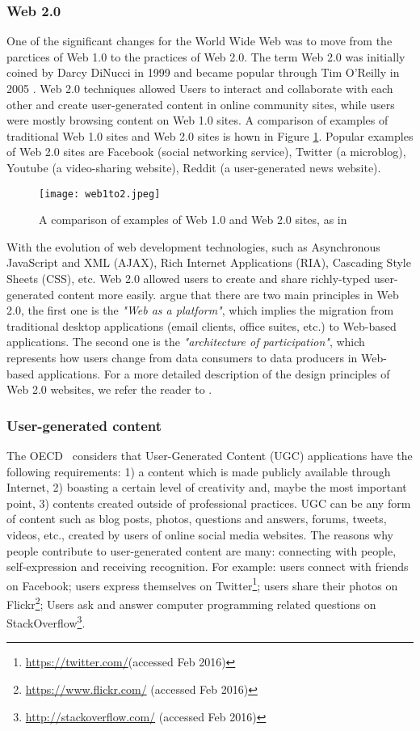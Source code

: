 \subsubsection{Web 2.0}
One of the significant changes for the World Wide Web was to move from the parctices of Web 1.0 to the practices of Web 2.0. The term Web 2.0 was initially coined by Darcy DiNucci in 1999  \cite{dinucci2012fragmented} and became popular through Tim O'Reilly in 2005 \cite{o2009design}. Web 2.0 techniques allowed Users to interact and collaborate with each other and create user-generated content in online community sites, while users were mostly browsing content on Web 1.0 sites. A comparison of examples of traditional Web 1.0 sites and Web 2.0 sites is hown in Figure \ref{fig:web1to2}. Popular examples of Web 2.0 sites are Facebook (social networking service), Twitter (a microblog), Youtube (a video-sharing website), Reddit (a user-generated news website).

\begin{figure}%
\centering
\texttt{[image: web1to2.jpeg]}  
\caption{A comparison of examples of Web 1.0 and Web 2.0 sites, as in \cite{o2009design}}
\label{fig:web1to2} 
\end{figure}
With the evolution of web development technologies, such as Asynchronous JavaScript and XML (AJAX), Rich Internet Applications (RIA), Cascading Style Sheets (CSS), etc. Web 2.0 allowed users to create and share richly-typed user-generated content more easily. \cite{passant2009technologies} argue that there are two main principles in Web 2.0, the first one is the \textit{"Web as a platform"}, which implies the migration from traditional desktop applications (email clients, office suites, etc.) to Web-based applications. The second one is the \textit{"architecture of participation"}, which represents how users change from data consumers to data producers in Web-based applications. For a more detailed description of the design principles of Web 2.0 websites, we refer the reader to \cite{o2009design}. 


\subsubsection{User-generated content}
The OECD~\cite{web2007web} considers that User-Generated Content (UGC) applications have the following requirements: 1) a content which is made publicly available through Internet, 2) boasting a certain level of creativity and, maybe the most important point, 3) contents created outside of professional practices. UGC can be any form of content such as blog posts, photos, questions and answers, forums, tweets, videos, etc., created by users of online social media websites. \cite{moens2014mining} The reasons why people contribute to user-generated content are many: connecting with people, self-expression and receiving recognition. For example: users connect with friends on Facebook; users express themselves on Twitter\footnote{\url{https://twitter.com/}(accessed Feb 2016)}; users share their photos on Flickr\footnote{\url{https://www.flickr.com/} (accessed Feb 2016)}; Users ask and answer computer programming related questions on StackOverflow\footnote{\url{http://stackoverflow.com/} (accessed Feb 2016)}. 

